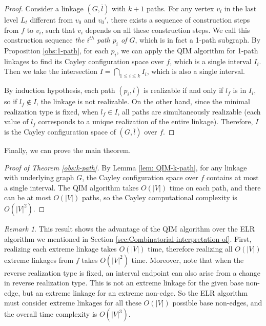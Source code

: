 \documentclass[secthm,amsthm,english]{article}
\theoremstyle{definition}
\theoremstyle{remark}
\newtheorem{remark}{Remark}
\begin{document}
\begin{proof}
Consider a linkage $(G, \bar{l})$ with $k+1$ paths. 
For any vertex $v_i$ in the last level $L_t$ different from $v_0$ and $v_0'$, 
there exists a sequence of construction steps from $f$ to $v_i$, 
such that $v_i$ depends on all these construction steps. 
We call this construction sequence \emph{the $i^{th}$ path $p_i$ of $G$}, 
which is in fact a 1-path subgraph. By Proposition \ref{obs:1-path}, for each $p_i$, 
we can apply the QIM algorithm for 1-path linkages to find its Cayley configuration space 
over $f$, which is a single interval $I_i$. 
Then we take the intersection $I = \bigcap \limits_{1 \le i \le k} I_i$, which is also a single interval. 

By induction hypothesis, each path $(p_i, \bar{l})$ is realizable if and only if $l_f$ is in $I_i$, so if $l_f \notin I$, the linkage is not realizable. 
On the other hand, since the minimal realization type is fixed, when $l_f \in I$, all paths are simultaneously realizable 
(each value of $l_f$ corresponds to a unique realization of the entire linkage). 
Therefore, $I$ is the Cayley configuration space of $(G, \bar{l})$ over $f$.  
\end{proof}





Finally, we can prove the main theorem. 

\begin{proof}[Proof of Theorem \ref{obs:k-path}]
By Lemma \ref{lem: QIM-k-path}, for any linkage with underlying graph $G$, 
the Cayley configuration space over $f$ contains at most a single interval. 
The QIM algorithm takes $O(|V|)$ time on each path, and there can be at most $O(|V|)$ paths, so 
the Cayley computational complexity is  $O(|V|^2)$. 
\end{proof}

\begin{remark} This result shows the advantage of the QIM algorithm over the ELR algorithm we mentioned in Section \ref{sec:Combinatorial-interpretation-of}. First, realizing each extreme linkage takes $O(|V|)$ time, 
therefore realizing all $O(|V|)$ extreme linkages from $f$ takes $O(|V|^2)$ time. 
Moreover, note that when the reverse realization type is fixed, an interval endpoint can also arise from a change in reverse realization type. 
This is not an extreme linkage for the given base non-edge, but an extreme linkage for an extreme non-edge. 
So the ELR algorithm must consider extreme linkages for all these $O(|V|)$ possible base non-edges, 
 and the overall time complexity is $O(|V|^{3})$.
\end{remark} 
\end{document}
